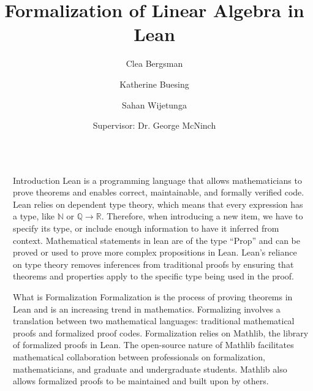 \documentclass[final]{beamer}
\title{Formalization of Linear Algebra in Lean}
\author{Clea Bergsman \inst{1} \and Katherine Buesing \inst{2} \and Sahan Wijetunga \inst{3} \and Supervisor: Dr. George McNinch \inst{4}}
\institute[shortinst]{\inst{1} Bowdoin College \samelineand \inst{2} University of Minnesota, Twin Cities \samelineand\inst{3} University of California, Los Angeles \samelineand \inst{4} Tufts University}
\newlength{\sepwidth}
\newlength{\colwidth}
\newcommand{\separatorcolumn}{\begin{column}{\sepwidth}\end{column}}
\begin{document}
\doublespacing

\begin{frame}[t]
\begin{columns}[t]
\separatorcolumn

\begin{column}{\colwidth}

\begin{exampleblock}{{\LARGE Introduction}}
{\large
Lean is a programming language that allows mathematicians to prove theorems and enables correct, maintainable, and formally verified code. Lean relies on dependent type theory, which means that every expression has a type, like $\mathbb{N}$ or $\mathbb{Q} \rightarrow \mathbb{R}$. Therefore, when introducing a new item, we have to specify its type, or include enough information to have it inferred from context. Mathematical statements in lean are of the type “Prop” and can be proved or used to prove more complex propositions in Lean. Lean’s reliance on type theory removes inferences from traditional proofs by ensuring that theorems and properties apply to the specific type being used in the proof.
}
\end{exampleblock}

\begin{exampleblock}{{\LARGE What is Formalization}}
{\large
Formalization is the process of proving theorems in Lean and is an increasing trend in mathematics. Formalizing involves a translation between two mathematical languages: traditional mathematical proofs and formalized proof codes. Formalization relies on Mathlib, the library of formalized proofs in Lean. The open-source nature of Mathlib facilitates mathematical collaboration between professionals on formalization, mathematicians, and graduate and undergraduate students. Mathlib also allows formalized proofs to be maintained and built upon by others.
}
\end{exampleblock}


\end{column}
\end{columns}
\end{frame}
\end{document}

